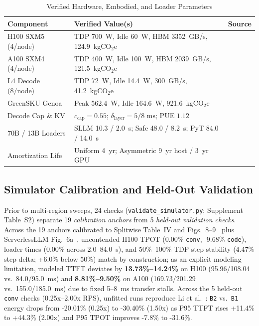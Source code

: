 \begin{table}[t]
\centering
\caption{Verified Hardware, Embodied, and Loader Parameters}
\label{tab:params}
\scriptsize
\setlength{\tabcolsep}{3pt}
\begin{tabular}{@{}>{\raggedright\arraybackslash}p{2.15cm}>{\raggedright\arraybackslash}p{4.35cm}l@{}}
\toprule
\textbf{Component} & \textbf{Verified Value(s)} & \textbf{Source} \\
\midrule
H100 SXM5 (4/node) & TDP \SI{700}{\watt}, Idle \SI{60}{\watt}, HBM 3352~GB/s, 124.9~kgCO$_2$e & \cite{patel2024splitwise,li2025ecoserve} \\
A100 SXM4 (4/node) & TDP \SI{400}{\watt}, Idle \SI{100}{\watt}, HBM 2039~GB/s, 121.5~kgCO$_2$e & \cite{patel2024splitwise,li2025ecoserve} \\
L4 Decode (8/node) & TDP \SI{72}{\watt}, Idle \SI{14.4}{\watt}, 300~GB/s, 41.2~kgCO$_2$e & \cite{li2025ecoserve} \\
GreenSKU Genoa & Peak \SI{562.4}{\watt}, Idle \SI{164.6}{\watt}, 921.6~kgCO$_2$e & \cite{azure2024trace,li2025ecoserve} \\
Decode Cap \& KV & $c_{\text{cap}}=0.55$; $\delta_{\text{layer}}=5/8\text{ ms}$; PUE $1.12$ & \cite{patel2024splitwise} \\
70B / 13B Loaders & SLLM 10.3 / 2.0~s; Safe 48.0 / 8.2~s; PyT 84.0 / 14.0~s & \cite{fu2024serverlessllm} \\
Amortization Life & Uniform 4~yr; Asymmetric 9~yr host / 3~yr GPU & \cite{li2025ecoserve,gupta2021chasing} \\
\bottomrule
\end{tabular}
\end{table}

\subsection{Simulator Calibration and Held-Out Validation}\label{subsec:validation}
Prior to multi-region sweeps, 24 checks (\texttt{validate\_simulator.py}; Supplement Table~S2) separate 19 \emph{calibration anchors} from 5 \emph{held-out validation checks}. Across the 19 anchors calibrated to Splitwise Table~IV and Figs.~8--9~\cite{patel2024splitwise} plus ServerlessLLM Fig.~6a~\cite{fu2024serverlessllm}, uncontended H100 TPOT (0.00\% \texttt{conv}, -9.68\% \texttt{code}), loader times (0.00\% across 2.0--84.0~s), and 50\%--100\% TDP step stability (4.47\% step delta; +6.0\% below 50\%) match by construction; as an explicit modeling limitation, modeled TTFT deviates by \textbf{13.73\%--14.24\%} on H100 (95.96/108.04 vs.\ 84.0/95.0~ms) and \textbf{8.81\%--9.50\%} on A100 (169.73/201.29 vs.\ 155.0/185.0~ms) due to fixed 5--8~ms transfer stalls. Across the 5 held-out \texttt{conv} checks (0.25x--2.00x RPS), unfitted runs reproduce Li et al.~\cite{li2026revisiting}: \texttt{B2} vs.\ \texttt{B1} energy drops from -20.01\% (0.25x) to -30.40\% (1.50x) as P95 TTFT rises +11.4\% to +44.3\% (2.00x) and P95 TPOT improves -7.8\% to -31.6\%.

